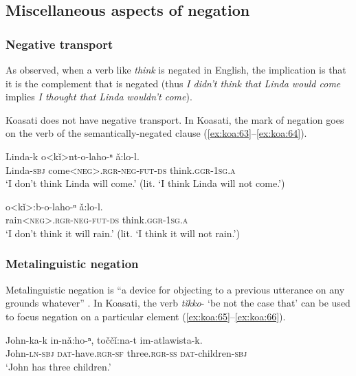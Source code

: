 \documentclass[output=paper,colorlinks,citecolor=brown]{langscibook}
\begin{document}
\subsection{Miscellaneous aspects of negation}\label{sec:koa:4.6} 
\subsubsection{Negative transport}\label{sec:koa:4.6.1}
As \citet{Fillmore1963} observed, when a verb like \textit{think} is negated in English, the implication is that it is the complement that is negated (thus \textit{I didn’t think that Linda would come} implies \textit{I thought that Linda wouldn’t come}).

Koasati does not have negative transport. In Koasati, the mark of negation goes on the verb of the semantically-negated clause (\ref{ex:koa:63}--\ref{ex:koa:64}).


\ea\label{ex:koa:63}
    \gll Linda-k  o<kǐ>nt-o-laho-ⁿ ǎ:lo-l.\\ 
         Linda-\textsc{sbj}  come<\textsc{neg}>.\textsc{rgr}-\textsc{neg}-\textsc{fut}-\textsc{ds} think.\textsc{ggr}-1\textsc{sg.a} \\
    \glt ‘I don’t think Linda will come.’ (lit. ‘I think Linda will not   come.’)
\z 

\ea\label{ex:koa:64}
    \gll o<kǐ>:b-o-laho-ⁿ  ǎ:lo-l. \\ 
         rain<\textsc{neg}>.\textsc{rgr}-\textsc{neg}-\textsc{fut}-\textsc{ds}  think.\textsc{ggr}-1\textsc{sg.a} \\
    \glt ‘I don’t think it will rain.’ (lit. ‘I think it will not rain.’) 
\z 

\subsubsection{Metalinguistic negation}\label{sec:koa:4.6.2}

Metalinguistic negation is “a device for objecting to a previous utterance on any grounds whatever” \citep[363]{Horn1989}. In Koasati, the verb \textit{tǐkko}- ‘be not the case that’ can be used to focus negation on a particular element (\ref{ex:koa:65}--\ref{ex:koa:66}).

\ea\label{ex:koa:65}
    \gll John-ka-k  in-n\v{a}:ho-ⁿ,  točč\v{i}:na-t  im-atlawista-k. \\ 
         John-\textsc{ln-sbj}  \textsc{dat}-have.\textsc{rgr-sf}  three.\textsc{rgr-ss}  \textsc{dat}-children-\textsc{sbj} \\
    \glt ‘John has three children.’
\z 
\end{document}
